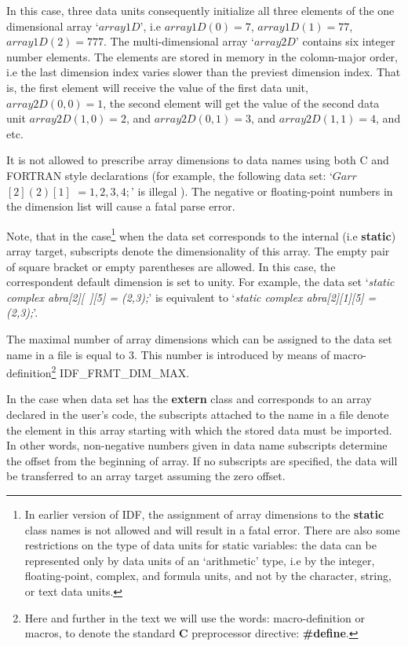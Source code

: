 

In this case, three data units consequently initialize all three elements
of the one dimensional array `$array1D$', i.e $array1D(0)=7$,
$array1D(1)=77$, $array1D(2)=777$.
The multi-dimensional array `$array2D$' contains six integer number elements. 
The elements are stored in memory in the colomn-major order, i.e the last
dimension index varies slower than the previest dimension index.
That is, the first element will receive the value of the first data unit,
$array2D(0,0)=1$, the second element will get the value of the second data unit
$array2D(1,0)=2$, and $array2D(0,1)=3$, and $array2D(1,1)=4$, and etc.

It is not allowed to prescribe array dimensions to data names
using both C and FORTRAN style declarations
(for example, the following data set: 
`$Garr$ $ [2](2)[1]$ $= 1,2,3,4;$'
is illegal ).
The negative or floating-point numbers in the dimension list
will cause a fatal parse error.

Note, that in the case\footnote{
In earlier version of IDF, the assignment of array dimensions
to the {\bf static} class names is not allowed and will result
in a fatal error. There are also some restrictions on the type
of data units for static variables:
the data can be represented only by data units of an `arithmetic' type,
i.e by the integer, floating-point, complex, and formula units,
and not by the character, string, or text data units.
}
when the data set corresponds to the
internal (i.e {\bf static}) array target,
subscripts denote the dimensionality of this array.
The empty pair of square bracket or empty parentheses are allowed.
In this case, the correspondent default dimension is set to unity.
For example, the data set `{\it static complex abra[2][\ ][5] = (2,3);}'
is equivalent to `{\it static complex abra[2][1][5] = (2,3);}'.

The maximal number of array dimensions
which can be assigned to the data set name in a file
is equal to 3.
This number is introduced by means of macro-definition\footnote{
Here and further in the text we will use the words: 
macro-definition or macros,
to denote the standard {\bf C} preprocessor directive:
{\bf \#define}.
} IDF\_FRMT\_DIM\_MAX.

In the case when data set has the 
{\bf extern} class and corresponds
to an array declared in the user's code,
the subscripts attached to the name in a file
denote the element in this array
starting with which the stored data must be imported.
In other words, non-negative numbers given in data name subscripts
determine the offset from the beginning of array.
If no subscripts are specified, the data will be
transferred to an array target assuming the zero offset.

